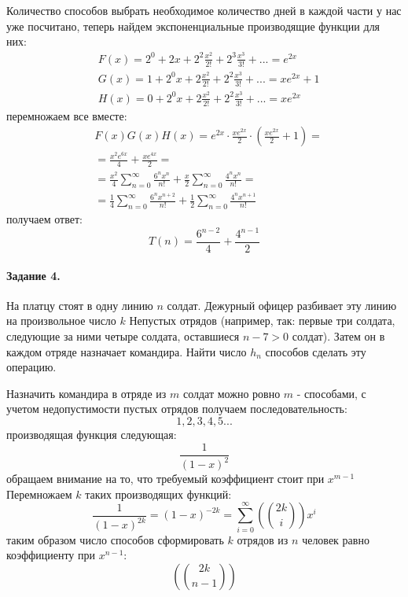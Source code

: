 \documentclass[a4paper,12pt]{article}
\begin{document}
\begin{Solution}
Количество способов выбрать необходимое количество дней в каждой части у нас уже посчитано, теперь найдем экспоненциальные производящие функции для них:
\[
	\begin{split}
		& F\left(x\right) = 2^0 + 2 x + 2^2 \frac{x^2}{2!} + 2^3 \frac{x^3}{3!} + ... = e^{2x} \\
		& G\left(x\right) = 1 + 2^0 x + 2 \frac{x^2}{2!} + 2^2 \frac{x^3}{3!} + ...  = x e^{2x} + 1 \\
		& H\left(x\right) = 0 + 2^0 x + 2 \frac{x^2}{2!} + 2^2 \frac{x^3}{3!} + ... = x e^{2x}
	\end{split}
\]
перемножаем все вместе:
\[
	\begin{split}
		& F\left(x\right) G\left(x\right) H\left(x\right) = e^{2x} \cdot \frac{x e^{2x}}{2} \cdot \left(\frac{x e^{2x}}{2} + 1\right) = \\
		& = \frac{x^2 e^{6x}}{4} + \frac{x e^{4x}}{2} = \\
		& = \frac{x^2}{4} \sum_{n=0}^{\infty} \frac{6^n x^n}{n!} + \frac{x}{2} \sum_{n=0}^{\infty} \frac{4^n x^n}{n!} = \\
		& = \frac{1}{4} \sum_{n=0}^{\infty} \frac{6^n x^{n+2}}{n!} + \frac{1}{2} \sum_{n=0}^{\infty} \frac{4^n x^{n+1}}{n!}
	\end{split}
\]
получаем ответ:
\[
	T\left(n\right) = \frac{6^{n-2}}{4} + \frac{4^{n-1}}{2}
\]
\end{Solution}

\paragraph{Задание 4.} На платцу стоят в одну линию $n$ солдат. Дежурный офицер разбивает эту линию на произвольное число $k$ Непустых отрядов (например, так: первые три солдата, следующие за ними четыре солдата, оставшиеся $n-7>0$ солдат). Затем он в каждом отряде назначает командира. Найти число $h_n$ способов сделать эту операцию.

\begin{Solution}
Назначить командира в отряде из $m$ солдат можно ровно $m$ - способами, с учетом недопустимости пустых отрядов получаем последовательность:
\[
	1, 2, 3, 4, 5 ...
\]
производящая функция следующая:
\[
	\frac{1}{\left(1-x\right)^2}
\]
обращаем внимание на то, что требуемый коэффициент стоит при $x^{m-1}$
Перемножаем $k$ таких производящих функций:
\[
	\frac{1}{\left(1-x\right)^{2k}} = \left(1-x\right)^{-2k} = \sum_{i=0}^{\infty} \left(\binom{2k}{i}\right) x^i
\]
таким образом число способов сформировать $k$ отрядов из $n$ человек равно коэффициенту при $x^{n-1}$:
\[
		\left(\binom{2k}{n-1}\right)
\]
\end{Solution}
\end{document}
